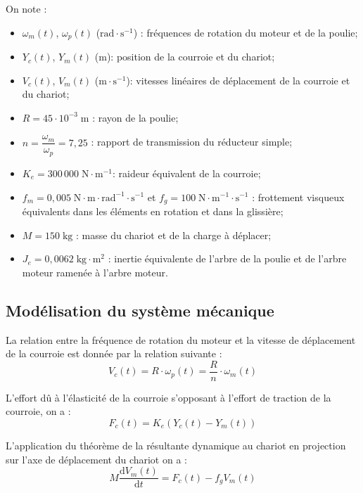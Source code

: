 \documentclass[10pt,fleqn]{article} %
\begin{document}
\begin{multicols}{2}
On note : 
\begin{itemize}[label=$\blacksquare$,font=\tiny]
\item $\omega_m(t)$, $\omega_p(t)$ ($\text{rad}\cdot \text{s}^{-1}$) : fréquences de rotation du moteur et de la poulie;
\item $Y_c(t)$, $Y_m(t)$ ($\text{m}$): position de la courroie et du chariot;
\item $V_c(t)$, $V_m(t)$ ($\text{m}\cdot \text{s}^{-1}$): vitesses linéaires de déplacement de la courroie et du chariot;
\item $R =45\cdot 10^{-3} \; \text{m}$ : rayon de la poulie;
\item $n=\dfrac{\omega_m}{\omega_p} = 7,25$ : rapport de transmission du réducteur simple;
\item $K_e = 300\, 000 \; \text{N}\cdot \text{m}^{-1} $: raideur équivalent de la courroie;
\item $f_m = 0,005\; \text{N}\cdot\text{m}\cdot\text{rad}^{-1}\cdot\text{s}^{-1}$ et $f_g = 100\; \text{N}\cdot\text{m}^{-1}\cdot\text{s}^{-1}$ : frottement visqueux équivalents dans les éléments en rotation et dans la glissière;
\item $M = 150 \; \text{kg}$ : masse du chariot et de la charge à déplacer;
\item $J_e = 0,0062 \; \text{kg} \cdot \text{m}^2 $ : inertie équivalente de l'arbre de la poulie et de l'arbre moteur ramenée à l'arbre moteur.
\end{itemize}


\subsection*{Modélisation du système mécanique}
La relation entre la fréquence de rotation du moteur et la vitesse de déplacement de la courroie est donnée par la relation suivante :
\begin{equation}
V_c(t) = R \cdot  \omega_p(t) = \dfrac{R}{n} \cdot \omega_m(t)
\end{equation}



L'effort dû à l'élasticité de la courroie s'opposant à l'effort de traction de la courroie, on a :
\begin{equation}
F_c(t) = K_e \left(Y_c(t) - Y_m(t) \right)
\end{equation}

L'application du théorème de la résultante dynamique au chariot en projection sur l'axe de déplacement du chariot on a : 
\begin{equation}
M\dfrac{\text{d}V_m(t)}{\text{d}t} = F_c(t) - f_g V_m(t)
\end{equation}


\end{multicols}
\end{document}
